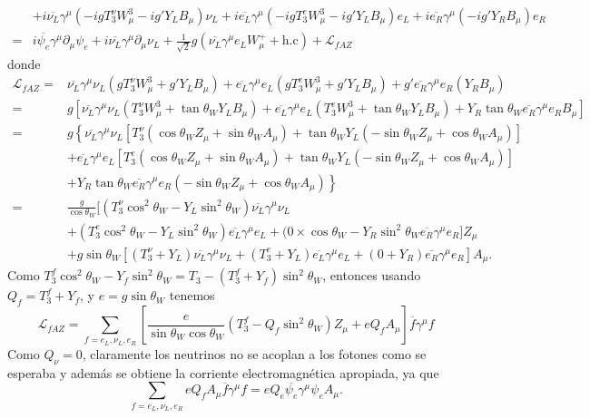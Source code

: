 \begin{itemize}
\begin{align}
&+i\overline{\nu_L}\gamma^\mu(-igT_3^\nu W^3_\mu-ig'Y_LB_\mu)\nu_L+i\overline{e_L}\gamma^\mu(-igT_3^eW^3_\mu-ig'Y_LB_\mu)e_L
+i\overline{e_R}\gamma^\mu(-ig'Y_R B_\mu)e_R
\nonumber\\
=&i\overline{\psi_e}\gamma^\mu\partial_\mu\psi_e+i\overline{\nu_L}\gamma^\mu\partial_\mu\nu_L
+\frac{1}{\sqrt{2}}g\left(\overline{\nu_L}\gamma^\mu e_LW^+_\mu+\text{h.c}\right)+\mathcal{L}_{fAZ}
\end{align}
donde
\begin{align}
\mathcal{L}_{fAZ}=&\overline{\nu_L}\gamma^\mu\nu_L(gT_3^\nu W^3_\mu+g'Y_LB_\mu)+\overline{e_L}\gamma^\mu e_L(gT_3^eW^3_\mu+g'Y_LB_\mu)
+g'\overline{e_R}\gamma^\mu e_R(Y_R B_\mu)
\nonumber\\
=&g\left[\overline{\nu_L}\gamma^\mu\nu_L(T_3^\nu W^3_\mu+\tan\theta_WY_LB_\mu)+\overline{e_L}\gamma^\mu e_L(T_3^eW^3_\mu+\tan\theta_WY_LB_\mu)
+Y_R\tan\theta_W\overline{e_R}\gamma^\mu e_RB_\mu\right]\nonumber\\
=&g\left\{\overline{\nu_L}\gamma^\mu\nu_L[T_3^\nu(\cos\theta_WZ_\mu+\sin\theta_WA_\mu)+\tan\theta_WY_L(-\sin\theta_WZ_\mu+\cos\theta_WA_\mu)]\right.\nonumber\\
&+\overline{e_L}\gamma^\mu e_L[T_3^e(\cos\theta_WZ_\mu+\sin\theta_WA_\mu)+\tan\theta_WY_L(-\sin\theta_WZ_\mu+\cos\theta_WA_\mu)]\nonumber\\
&\left.+Y_R\tan\theta_W\overline{e_R}\gamma^\mu e_R(-\sin\theta_WZ_\mu+\cos\theta_WA_\mu)\right\} 
\nonumber\\
=&\frac{g}{\cos\theta_W}[(T_3^\nu\cos^2\theta_W-Y_L\sin^2\theta_W )\overline{\nu_L}\gamma^\mu\nu_L\nonumber\\
&+(T^e_3\cos^2\theta_W-Y_L\sin^2\theta_W)\overline{e_L}\gamma^\mu e_L+(0\times\cos\theta_W-Y_R\sin^2\theta_W\overline{e_R}\gamma^\mu e_R]Z_\mu\nonumber\\
&+g\sin\theta_W[(T^\nu_3+Y_L)\overline{\nu_L}\gamma^\mu\nu_L+(T_3^e+Y_L)\overline{e_L}\gamma^\mu e_L+(0+Y_R)\overline{e_R}\gamma^\mu e_R]A_\mu.
\end{align}
Como $T_3^f\cos^2\theta_W-Y_f\sin^2\theta_W=T_3-(T_3^f+Y_f)\sin^2\theta_W$, entonces usando $Q_f=T_3^f+Y_f$, y $e=g\sin\theta_W$ tenemos
\begin{equation}
\mathcal{L}_{fAZ}=\sum_{f=e_L,\nu_L,e_R}\left[\frac{e}{\sin\theta_W\cos\theta_W}(T_3^f-Q_f\sin^2\theta_W )Z_\mu+eQ_fA_\mu\right]\overline{f}\gamma^\mu f
\end{equation}
Como $Q_\nu=0$, claramente los neutrinos no se acoplan a los fotones como se esperaba y adem\'as se obtiene la corriente electromagn\'etica apropiada, ya que
\begin{equation}
  \sum_{f=e_L,\nu_L,e_R}eQ_fA_\mu\overline{f}\gamma^\mu f=eQ_e\overline{\psi_e}\gamma^\mu\psi_eA_\mu.
\end{equation}
 
\end{itemize}

